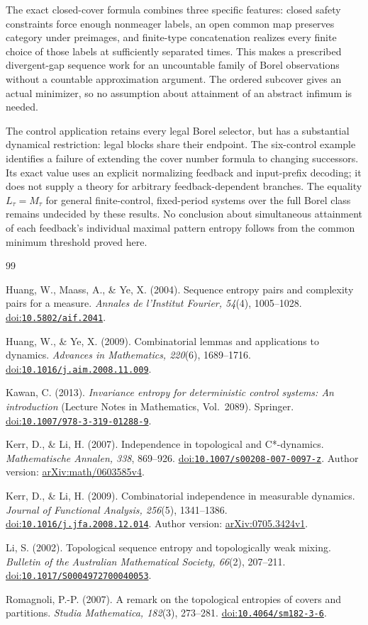 \documentclass[11pt,reqno]{amsart}
\numberwithin{equation}{section}
\theoremstyle{definition}
\theoremstyle{remark}
\newcommand{\doi}[1]{\href{https://doi.org/#1}{doi:\nolinkurl{#1}}}
\begin{document}
The exact closed-cover formula combines three specific features:
closed safety constraints force enough nonmeager labels, an open common
map preserves category under preimages, and finite-type concatenation
realizes every finite choice of those labels at sufficiently separated
times. This makes a prescribed divergent-gap sequence work for an
uncountable family of Borel observations without a countable
approximation argument. The ordered subcover gives an actual minimizer,
so no assumption about attainment of an abstract infimum is needed.

The control application retains every legal Borel selector, but has a
substantial dynamical restriction: legal blocks share their endpoint.
The six-control example identifies a failure of extending the cover
number formula to changing successors. Its exact value uses an explicit
normalizing feedback and input-prefix decoding; it does not supply a
theory for arbitrary feedback-dependent branches. The equality
$L_\tau=M_\tau$ for general finite-control, fixed-period systems over
the full Borel class remains undecided by these results. No conclusion
about simultaneous attainment of each feedback's individual maximal
pattern entropy follows from the common minimum threshold proved here.

\begin{thebibliography}{99}

Huang, W., Maass, A., \& Ye, X. (2004).
Sequence entropy pairs and complexity pairs for a measure.
\emph{Annales de l'Institut Fourier, 54}(4), 1005--1028.
\doi{10.5802/aif.2041}.

Huang, W., \& Ye, X. (2009).
Combinatorial lemmas and applications to dynamics.
\emph{Advances in Mathematics, 220}(6), 1689--1716.
\doi{10.1016/j.aim.2008.11.009}.

Kawan, C. (2013).
\emph{Invariance entropy for deterministic control systems: An introduction}
(Lecture Notes in Mathematics, Vol.~2089). Springer.
\doi{10.1007/978-3-319-01288-9}.

Kerr, D., \& Li, H. (2007).
Independence in topological and C*-dynamics.
\emph{Mathematische Annalen, 338}, 869--926.
\doi{10.1007/s00208-007-0097-z}.
Author version: \href{https://arxiv.org/abs/math/0603585v4}{arXiv:math/0603585v4}.

Kerr, D., \& Li, H. (2009).
Combinatorial independence in measurable dynamics.
\emph{Journal of Functional Analysis, 256}(5), 1341--1386.
\doi{10.1016/j.jfa.2008.12.014}.
Author version: \href{https://arxiv.org/abs/0705.3424v1}{arXiv:0705.3424v1}.

Li, S. (2002).
Topological sequence entropy and topologically weak mixing.
\emph{Bulletin of the Australian Mathematical Society, 66}(2), 207--211.
\doi{10.1017/S0004972700040053}.

Romagnoli, P.-P. (2007).
A remark on the topological entropies of covers and partitions.
\emph{Studia Mathematica, 182}(3), 273--281.
\doi{10.4064/sm182-3-6}.

\end{thebibliography}
\end{document}

